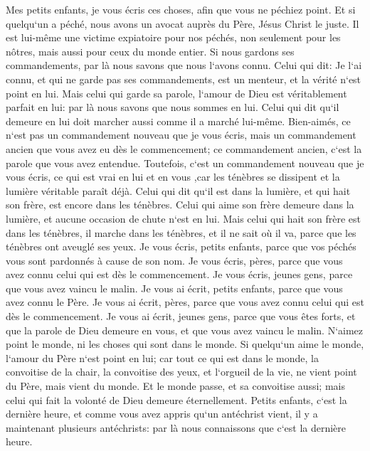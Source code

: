 \verse Mes petits enfants, je vous écris ces choses, afin que vous ne péchiez point. Et si quelqu`un a péché, nous avons un avocat auprès du Père, Jésus Christ le juste. 
\verse Il est lui-même une victime expiatoire pour nos péchés, non seulement pour les nôtres, mais aussi pour ceux du monde entier. 
\verse Si nous gardons ses commandements, par là nous savons que nous l`avons connu. 
\verse Celui qui dit: Je l`ai connu, et qui ne garde pas ses commandements, est un menteur, et la vérité n`est point en lui. 
\verse Mais celui qui garde sa parole, l`amour de Dieu est véritablement parfait en lui: par là nous savons que nous sommes en lui. 
\verse Celui qui dit qu`il demeure en lui doit marcher aussi comme il a marché lui-même. 
\verse Bien-aimés, ce n`est pas un commandement nouveau que je vous écris, mais un commandement ancien que vous avez eu dès le commencement; ce commandement ancien, c`est la parole que vous avez entendue. 
\verse Toutefois, c`est un commandement nouveau que je vous écris, ce qui est vrai en lui et en vous ,car les ténèbres se dissipent et la lumière véritable paraît déjà. 
\verse Celui qui dit qu`il est dans la lumière, et qui hait son frère, est encore dans les ténèbres. 
\verse Celui qui aime son frère demeure dans la lumière, et aucune occasion de chute n`est en lui. 
\verse Mais celui qui hait son frère est dans les ténèbres, il marche dans les ténèbres, et il ne sait où il va, parce que les ténèbres ont aveuglé ses yeux. 
\verse Je vous écris, petits enfants, parce que vos péchés vous sont pardonnés à cause de son nom. 
\verse Je vous écris, pères, parce que vous avez connu celui qui est dès le commencement. Je vous écris, jeunes gens, parce que vous avez vaincu le malin. Je vous ai écrit, petits enfants, parce que vous avez connu le Père. 
\verse Je vous ai écrit, pères, parce que vous avez connu celui qui est dès le commencement. Je vous ai écrit, jeunes gens, parce que vous êtes forts, et que la parole de Dieu demeure en vous, et que vous avez vaincu le malin. 
\verse N`aimez point le monde, ni les choses qui sont dans le monde. Si quelqu`un aime le monde, l`amour du Père n`est point en lui; 
\verse car tout ce qui est dans le monde, la convoitise de la chair, la convoitise des yeux, et l`orgueil de la vie, ne vient point du Père, mais vient du monde. 
\verse Et le monde passe, et sa convoitise aussi; mais celui qui fait la volonté de Dieu demeure éternellement. 
\verse Petits enfants, c`est la dernière heure, et comme vous avez appris qu`un antéchrist vient, il y a maintenant plusieurs antéchrists: par là nous connaissons que c`est la dernière heure. 
